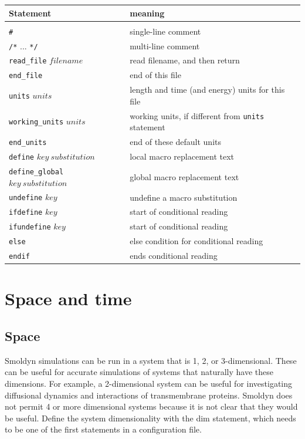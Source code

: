 \documentclass {scrbook}
\newcommand {\ttt} {\texttt}
\begin{document}
\begin{longtable}[c]{ll}
Statement & meaning\\
\hline\\
\ttt{\#} & single-line comment\\
\ttt{/*} ... \ttt{*/} & multi-line comment\\
\ttt{read\_file} $filename$ & read filename, and then return\\
\ttt{end\_file} & end of this file\\
\ttt{units} $units$ & length and time (and energy) units for this file\\
\ttt{working\_units} $units$ & working units, if different from \ttt{units} statement\\
\ttt{end\_units} & end of these default units\\
\ttt{define} $key\ substitution$ & local macro replacement text\\
\ttt{define\_global} $key\ substitution$ & global macro replacement text\\
\ttt{undefine} $key$ & undefine a macro substitution\\
\ttt{ifdefine} $key$ & start of conditional reading\\
\ttt{ifundefine} $key$ & start of conditional reading\\
\ttt{else} & else condition for conditional reading\\
\ttt{endif} & ends conditional reading\\
\end{longtable}



\chapter{Space and time}

\section{Space}

Smoldyn simulations can be run in a system that is 1, 2, or 3-dimensional. These can be useful for accurate simulations of systems that naturally have these dimensions. For example, a 2-dimensional system can be useful for investigating diffusional dynamics and interactions of transmembrane proteins. Smoldyn does not permit 4 or more dimensional systems because it is not clear that they would be useful. Define the system dimensionality with the dim statement, which needs to be one of the first statements in a configuration file.
\end{document}
